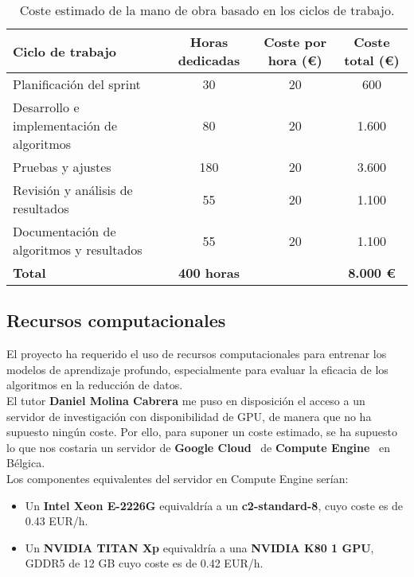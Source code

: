 \begin{table}[htp]\label{tab:mano-de-obra}
    \centering
    \begin{adjustbox}{width=\linewidth}
        \begin{tabular}{|l|c|c|c|}
            \hline
            \textbf{Ciclo de trabajo} & \textbf{Horas dedicadas} & \textbf{Coste por hora (€)} &
            \textbf{Coste total (€)} \\ \hline
            Planificación del sprint & 30 & 20 & 600 \\
            Desarrollo e implementación de algoritmos & 80 & 20 & 1.600 \\
            Pruebas y ajustes & 180 & 20 & 3.600 \\
            Revisión y análisis de resultados & 55 & 20 & 1.100 \\
            Documentación de algoritmos y resultados & 55 & 20 & 1.100 \\ \hline
            \textbf{Total} & \textbf{400 horas} & & \textbf{8.000 €} \\ \hline
        \end{tabular}
    \end{adjustbox}
    \caption{Coste estimado de la mano de obra basado en los ciclos de trabajo.}
\end{table}


\subsection{Recursos computacionales}\label{subsec:recursos-computacionales}
El proyecto ha requerido el uso de recursos computacionales para entrenar los modelos de aprendizaje profundo,
especialmente para evaluar la eficacia de los algoritmos en la reducción de datos. \\[6pt]

El tutor \textbf{Daniel Molina Cabrera} me puso en disposición el acceso a un servidor de investigación con
disponibilidad de GPU, de manera que no ha supuesto ningún coste.
Por ello, para suponer un coste estimado, se ha supuesto lo que nos costaria un servidor de
\textbf{Google Cloud}~\cite{noauthor_overview_nodate} de \textbf{Compute Engine}~\cite{noauthor_what_nodate} en
Bélgica. \\[6pt]

Los componentes equivalentes del servidor en Compute Engine serían:
\begin{itemize}
    \item Un \textbf{Intel Xeon E-2226G} equivaldría a un \textbf{c2-standard-8}, cuyo coste es de 0.43 EUR/h.
    \item Un \textbf{NVIDIA TITAN Xp} equivaldría a una \textbf{NVIDIA K80 1 GPU}, GDDR5 de 12 GB cuyo coste es de 0.42
EUR/h.
\end{itemize}

